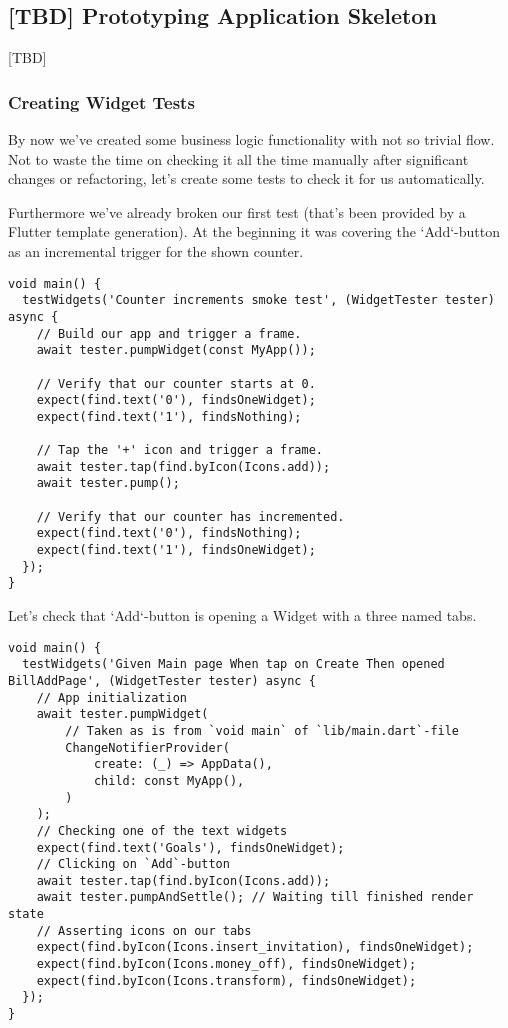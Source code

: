 
\subsection{[TBD] Prototyping Application Skeleton}

[TBD]

\subsubsection{Creating Widget Tests} \label{widget-tests}

By now we've created some business logic functionality with not so trivial flow. Not to waste the time on checking it
all the time manually after significant changes or refactoring, let's create some tests to check it for us automatically.

Furthermore we've already broken our first test (that's been provided by a Flutter template generation). At the 
beginning it was covering the `Add`-button as an incremental trigger for the shown counter.

\begin{lstlisting}
void main() {
  testWidgets('Counter increments smoke test', (WidgetTester tester) async {
    // Build our app and trigger a frame.
    await tester.pumpWidget(const MyApp());

    // Verify that our counter starts at 0.
    expect(find.text('0'), findsOneWidget);
    expect(find.text('1'), findsNothing);

    // Tap the '+' icon and trigger a frame.
    await tester.tap(find.byIcon(Icons.add));
    await tester.pump();

    // Verify that our counter has incremented.
    expect(find.text('0'), findsNothing);
    expect(find.text('1'), findsOneWidget);
  });
}
\end{lstlisting}

\noindent Let's check that `Add`-button is opening a Widget with a three named tabs.

\begin{lstlisting}
void main() {
  testWidgets('Given Main page When tap on Create Then opened BillAddPage', (WidgetTester tester) async {
    // App initialization
    await tester.pumpWidget(
        // Taken as is from `void main` of `lib/main.dart`-file
        ChangeNotifierProvider(
            create: (_) => AppData(),
            child: const MyApp(),
        )
    );
    // Checking one of the text widgets
    expect(find.text('Goals'), findsOneWidget);
    // Clicking on `Add`-button
    await tester.tap(find.byIcon(Icons.add));
    await tester.pumpAndSettle(); // Waiting till finished render state
    // Asserting icons on our tabs
    expect(find.byIcon(Icons.insert_invitation), findsOneWidget);
    expect(find.byIcon(Icons.money_off), findsOneWidget);
    expect(find.byIcon(Icons.transform), findsOneWidget);
  });
}
\end{lstlisting}

